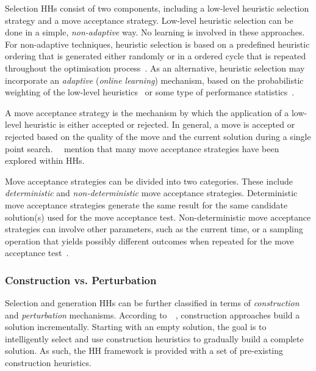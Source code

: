 Selection \acp{HH} consist of two components, including a low-level heuristic selection strategy and a move acceptance strategy. Low-level heuristic selection can be done in a simple, \textit{non-adaptive} way. No learning is involved in these approaches. For non-adaptive techniques, heuristic selection is based on a predefined heuristic ordering that is generated either randomly or in a ordered cycle that is repeated throughout the optimisation process~\cite{ref:cowling:2000}. As an alternative, heuristic selection may incorporate an \textit{adaptive} (\textit{online learning}) mechanism, based on the probabilistic weighting of the low-level heuristics~\cite{ref:burke:2003} or some type of performance statistics~\cite{ref:cowling:2000}.

A move acceptance strategy is the mechanism by which the application of a low-level heuristic is either accepted or rejected. In general, a move is accepted or rejected based on the quality of the move and the current solution during a single point search.~\citeauthor{ref:burke:2003}~\cite{ref:burke:2003} mention that many move acceptance strategies have been explored within \acp{HH}.

Move acceptance strategies can be divided into two categories. These include \textit{deterministic} and \textit{non-deterministic} move acceptance strategies. Deterministic move acceptance strategies generate the same result for the same candidate solution(s) used for the move acceptance test. Non-deterministic move acceptance strategies can involve other parameters, such as the current time, or a sampling operation that yields possibly different outcomes when repeated for the move acceptance test~\cite{ref:burke:2003}.


\subsubsection{Construction vs. Perturbation}

Selection and generation \acp{HH} can be further classified in terms of \textit{construction} and \textit{perturbation} mechanisms. According to~\citeauthor{ref:burke:2010}~\cite{ref:burke:2010}, construction approaches build a solution incrementally. Starting with an empty solution, the goal is to intelligently select and use construction heuristics to gradually build a complete solution. As such, the \acs{HH} framework is provided with a set of pre-existing construction heuristics.

